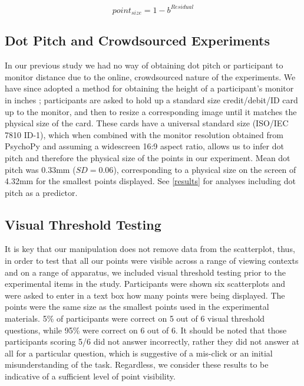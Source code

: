 \documentclass{vgtc}                          %
\begin{document}
\begin{equation}
  point_{size} = 1 - b^{Residual}
\end{equation}

\hypertarget{dot-pitch-and-crowdsourced-experiments}{%
\subsection{Dot Pitch and Crowdsourced Experiments}\label{dot-pitch-and-crowdsourced-experiments}}

In our previous study \cite{strain_2023} we had no way of obtaining dot pitch
or participant to monitor distance due to the online, crowdsourced nature of the
experiments. We have since adopted a method for obtaining the height of a
participant's monitor in inches \cite{screenscale}; participants are asked to hold up a standard size
credit/debit/ID card up to the monitor, and then to resize a corresponding image until
it matches the physical size of the card. These cards have a universal
standard size (ISO/IEC 7810 ID-1), which when combined with
the monitor resolution obtained from PsychoPy \cite{pierce_psychopy_2019}
and assuming a widescreen 16:9 aspect ratio,
allows us to infer dot pitch and therefore the physical size of the points in our
experiment. Mean dot pitch was 0.33mm (\(SD = 0.06\)),
corresponding to a physical size on the screen of 4.32mm
for the smallest points displayed. See \autoref{results} for analyses including dot pitch as a predictor.

\hypertarget{visual-threshold-testing}{%
\subsection{Visual Threshold Testing}\label{visual-threshold-testing}}

It is key that our manipulation does not remove data from the scatterplot,
thus, in order to test that all our points were visible across a range of viewing
contexts and on a range of apparatus, we included visual threshold testing prior
to the experimental items in the study. Participants were shown six scatterplots
and were asked to enter in a text box how many points
were being displayed. The points were the same size as the smallest points used
in the experimental materials. 5\% of
participants were correct on 5 out of 6 visual
threshold questions, while 95\% were correct
on 6 out of 6. It should be noted that those
participants scoring 5/6 did not answer incorrectly, rather they did not answer
at all for a particular question, which is suggestive of
a mis-click or an initial misunderstanding of the task. Regardless,
we consider these results to be indicative of a sufficient level of
point visibility.
\end{document}
